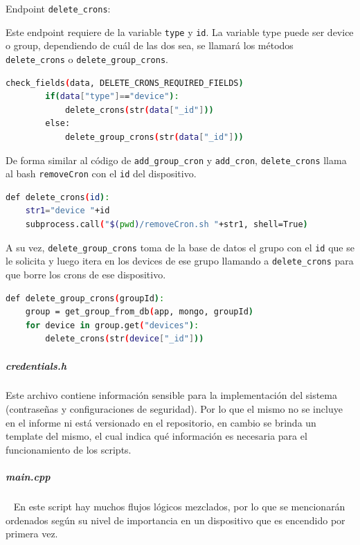 Endpoint \lstinline[columns=fixed]{delete_crons}:

Este endpoint requiere de la variable \lstinline[columns=fixed]{type} y \lstinline[columns=fixed]{id}. La variable type puede ser device o group, dependiendo de cuál de las dos sea, se llamará los métodos \lstinline[columns=fixed]{delete_crons} o \lstinline[columns=fixed]{delete_group_crons}.

\begin{lstlisting}[language=bash]
check_fields(data, DELETE_CRONS_REQUIRED_FIELDS)
        if(data["type"]=="device"):
            delete_crons(str(data["_id"]))
        else:
            delete_group_crons(str(data["_id"]))
\end{lstlisting}

De forma similar al código de \lstinline[columns=fixed]{add_group_cron} y \lstinline[columns=fixed]{add_cron}, \lstinline[columns=fixed]{delete_crons} llama al bash \lstinline[columns=fixed]{removeCron} con el \lstinline[columns=fixed]{id} del dispositivo. 

\begin{lstlisting}[language=bash]
def delete_crons(id):
    str1="device "+id
    subprocess.call("$(pwd)/removeCron.sh "+str1, shell=True)
\end{lstlisting}

A su vez, \lstinline[columns=fixed]{delete_group_crons} toma de la base de datos el grupo con el \lstinline[columns=fixed]{id} que se le solicita y luego itera en los devices de ese grupo llamando a \lstinline[columns=fixed]{delete_crons} para que borre los crons de ese dispositivo.

\begin{lstlisting}[language=bash]
def delete_group_crons(groupId):
    group = get_group_from_db(app, mongo, groupId)
    for device in group.get("devices"):
        delete_crons(str(device["_id"]))
\end{lstlisting}

\subparagraph{credentials.h}
%
Este archivo contiene información sensible para la implementación del sistema (contraseñas y configuraciones de seguridad). Por lo que el mismo no se incluye en el informe ni está versionado en el repositorio, en cambio se brinda un template del mismo, el cual indica qué información es necesaria para el funcionamiento de los scripts.~


\subparagraph{main.cpp} ~
%
En este script hay muchos flujos lógicos mezclados, por lo que se mencionarán ordenados según su nivel de importancia en un dispositivo que es encendido por primera vez.

